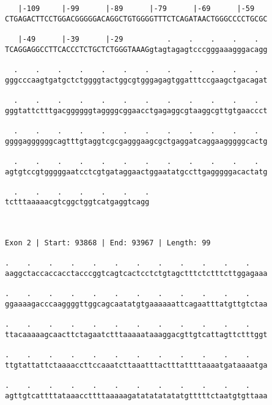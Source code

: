 \documentclass{article}
\begin{document}
\begin{Verbatim}
   |-109     |-99      |-89      |-79      |-69      |-59   
CTGAGACTTCCTGGACGGGGGACAGGCTGTGGGGTTTCTCAGATAACTGGGCCCCTGCGC
                                                            
   |-49      |-39      |-29          .    .    .    .    .  
TCAGGAGGCCTTCACCCTCTGCTCTGGGTAAAGgtagtagagtcccgggaaagggacagg
                                                            
  .    .    .    .    .    .    .    .    .    .    .    .  
gggcccaagtgatgctctggggtactggcgtgggagagtggatttccgaagctgacagat
                                                            
  .    .    .    .    .    .    .    .    .    .    .    .  
gggtattctttgacggggggtaggggcggaacctgagaggcgtaaggcgttgtgaaccct
                                                            
  .    .    .    .    .    .    .    .    .    .    .    .  
ggggaggggggcagtttgtaggtcgcgagggaagcgctgaggatcaggaagggggcactg
                                                            
  .    .    .    .    .    .    .    .    .    .    .    .  
agtgtccgtgggggaatcctcgtgataggaactggaatatgccttgagggggacactatg
                                                            
  .    .    .    .    .    .    .
tctttaaaaacgtcggctggtcatgaggtcagg
                                 
                                 
 
Exon 2 | Start: 93868 | End: 93967 | Length: 99
 
.    .    .    .    .    .    .    .    .    .    .    .    
aaggctaccaccacctacccggtcagtcactcctctgtagctttctctttcttggagaaa
                                                            
.    .    .    .    .    .    .    .    .    .    .    .    
ggaaaagacccaaggggttggcagcaatatgtgaaaaaattcagaatttatgttgtctaa
                                                            
.    .    .    .    .    .    .    .    .    .    .    .    
ttacaaaaagcaacttctagaatctttaaaaataaaggacgttgtcattagttctttggt
                                                            
.    .    .    .    .    .    .    .    .    .    .    .    
ttgtattattctaaaaccttccaaatcttaaatttactttattttaaaatgataaaatga
                                                            
.    .    .    .    .    .    .    .    .    .    .    .    
agttgtcattttataaaccttttaaaaagatatatatatatgtttttctaatgtgttaaa
                                                            

\end{Verbatim}
\end{document}
